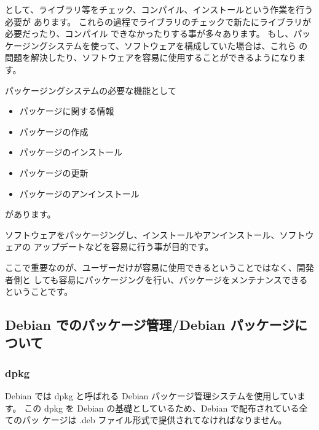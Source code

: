 \documentclass[mingoth,a4paper]{jsarticle}
\begin{document}
として、ライブラリ等をチェック、コンパイル、インストールという作業を行う必要が
あります。
これらの過程でライブラリのチェックで新たにライブラリが必要だったり、コンパイル
できなかったりする事が多々あります。
もし、パッケージングシステムを使って、ソフトウェアを構成していた場合は、これら
の問題を解決したり、ソフトウェアを容易に使用することができるようになります。

パッケージングシステムの必要な機能として
\begin{itemize}
	\item パッケージに関する情報
	\item パッケージの作成
	\item パッケージのインストール
	\item パッケージの更新
	\item パッケージのアンインストール
\end{itemize}
があります。

ソフトウェアをパッケージングし、インストールやアンインストール、ソフトウェアの
アップデートなどを容易に行う事が目的です。

ここで重要なのが、ユーザーだけが容易に使用できるということではなく、開発者側と
しても容易にパッケージングを行い、パッケージをメンテナンスできるということです。




\subsection{Debian でのパッケージ管理/Debian パッケージについて}

\subsubsection{dpkg}

	Debian では dpkg と呼ばれる Debian パッケージ管理システムを使用しています。
	この dpkg を Debian の基礎としているため、Debian で配布されている全てのパッ
	ケージは .deb ファイル形式で提供されてなければなりません。
	
\end{document}
